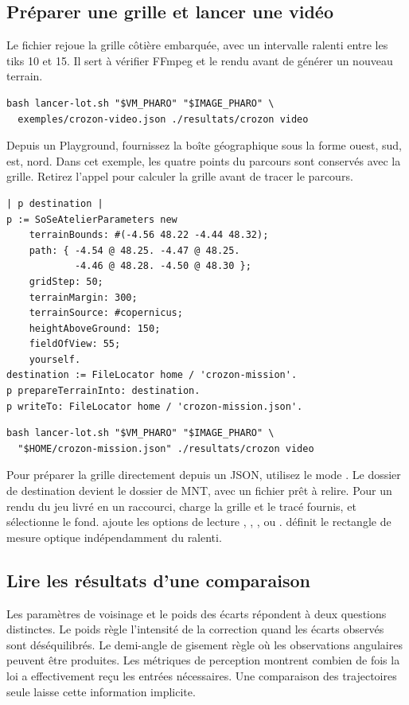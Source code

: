 \subsection{Préparer une grille et lancer une vidéo}
Le fichier  rejoue la grille côtière embarquée, avec un intervalle ralenti entre les tiks 10 et 15. Il sert à vérifier FFmpeg et le rendu avant de générer un nouveau terrain.

\begin{lstlisting}
bash lancer-lot.sh "$VM_PHARO" "$IMAGE_PHARO" \
  exemples/crozon-video.json ./resultats/crozon video
\end{lstlisting}

Depuis un Playground, fournissez la boîte géographique sous la forme ouest, sud, est, nord. Dans cet exemple, les quatre points du parcours sont conservés avec la grille. Retirez l'appel  pour calculer la grille avant de tracer le parcours.

\begin{lstlisting}
| p destination |
p := SoSeAtelierParameters new
    terrainBounds: #(-4.56 48.22 -4.44 48.32);
    path: { -4.54 @ 48.25. -4.47 @ 48.25.
            -4.46 @ 48.28. -4.50 @ 48.30 };
    gridStep: 50;
    terrainMargin: 300;
    terrainSource: #copernicus;
    heightAboveGround: 150;
    fieldOfView: 55;
    yourself.
destination := FileLocator home / 'crozon-mission'.
p prepareTerrainInto: destination.
p writeTo: FileLocator home / 'crozon-mission.json'.
\end{lstlisting}

\begin{lstlisting}
bash lancer-lot.sh "$VM_PHARO" "$IMAGE_PHARO" \
  "$HOME/crozon-mission.json" ./resultats/crozon video
\end{lstlisting}

Pour préparer la grille directement depuis un JSON, utilisez le mode . Le dossier de destination devient le dossier de MNT, avec un fichier  prêt à relire. Pour un rendu du jeu livré en un raccourci,  charge la grille et le tracé fournis, et  sélectionne le fond.  ajoute les options de lecture , , ,  ou .  définit le rectangle de mesure optique indépendamment du ralenti.

\clearpage
\subsection{Lire les résultats d'une comparaison}
Les paramètres de voisinage et le poids des écarts répondent à deux questions distinctes. Le poids règle l'intensité de la correction quand les écarts observés sont déséquilibrés. Le demi-angle de gisement règle où les observations angulaires peuvent être produites. Les métriques de perception montrent combien de fois la loi a effectivement reçu les entrées nécessaires. Une comparaison des trajectoires seule laisse cette information implicite.

